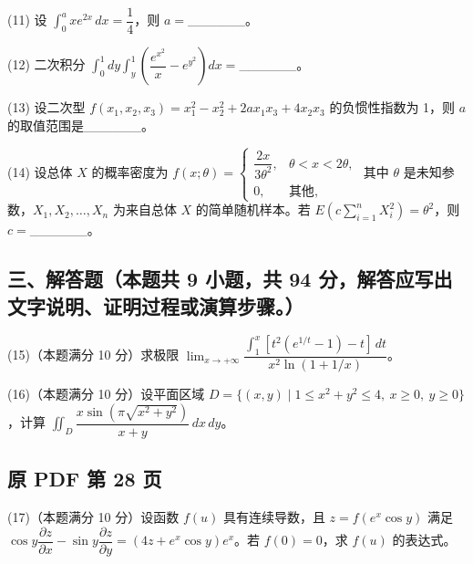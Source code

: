 \documentclass[UTF8,12pt]{ctexart}
\begin{document}
(11) 设 \(\displaystyle \int_0^a xe^{2x}\,dx=\dfrac{\displaystyle 1}{\displaystyle 4}\)，则 \(\displaystyle a=\)\_\_\_\_\_\_。


(12) 二次积分 \(\displaystyle \int_0^1dy\displaystyle \int_y^1\left(\dfrac{\displaystyle e^{x^2}}{\displaystyle x}-e^{y^2}\right)dx=\)\_\_\_\_\_\_。


(13) 设二次型 \(\displaystyle f(x_1,\allowbreak x_2,\allowbreak x_3)=x_1^2-x_2^2+2ax_1x_3+4x_2x_3\) 的负惯性指数为 1，则 \(\displaystyle a\) 的取值范围是\_\_\_\_\_\_。


(14) 设总体 \(\displaystyle X\) 的概率密度为 \(\displaystyle f(x;\theta)=\begin{cases}\dfrac{\displaystyle 2x}{\displaystyle 3\theta^2},\allowbreak &\theta<x<2\theta,\allowbreak \\0,\allowbreak &\text{其他},\allowbreak \end{cases}\) 其中 \(\displaystyle \theta\) 是未知参数，\(\displaystyle X_1,\allowbreak X_2,\allowbreak \ldots,\allowbreak X_n\) 为来自总体 \(\displaystyle X\) 的简单随机样本。若 \(\displaystyle E\left(c\displaystyle \sum_{i=1}^nX_i^2\right)=\theta^2\)，则 \(\displaystyle c=\)\_\_\_\_\_\_。


\subsection*{三、解答题（本题共 9 小题，共 94 分，解答应写出文字说明、证明过程或演算步骤。）}

(15)（本题满分 10 分）求极限 \(\displaystyle \lim_{x\to+\infty}\dfrac{\displaystyle \int_1^x[t^2(e^{1/t}-1)-t]\,dt}{\displaystyle x^2\ln(1+1/x)}\)。


(16)（本题满分 10 分）设平面区域 \(\displaystyle D=\{(x,\allowbreak y)\mid1\leq x^2+y^2\leq4,\allowbreak \ x\geq0,\allowbreak \ y\geq0\}\)，计算 \(\displaystyle \iint_D\dfrac{\displaystyle x\sin(\pi\sqrt{x^2+y^2})}{\displaystyle x+y}\,dx\,dy\)。


\clearpage

\subsection*{原 PDF 第 28 页}

(17)（本题满分 10 分）设函数 \(\displaystyle f(u)\) 具有连续导数，且 \(\displaystyle z=f(e^x\cos y)\) 满足 \(\displaystyle \cos y\dfrac{\displaystyle \partial z}{\displaystyle \partial x}-\sin y\dfrac{\displaystyle \partial z}{\displaystyle \partial y}=(4z+e^x\cos y)e^x\)。若 \(\displaystyle f(0)=0\)，求 \(\displaystyle f(u)\) 的表达式。
\end{document}
